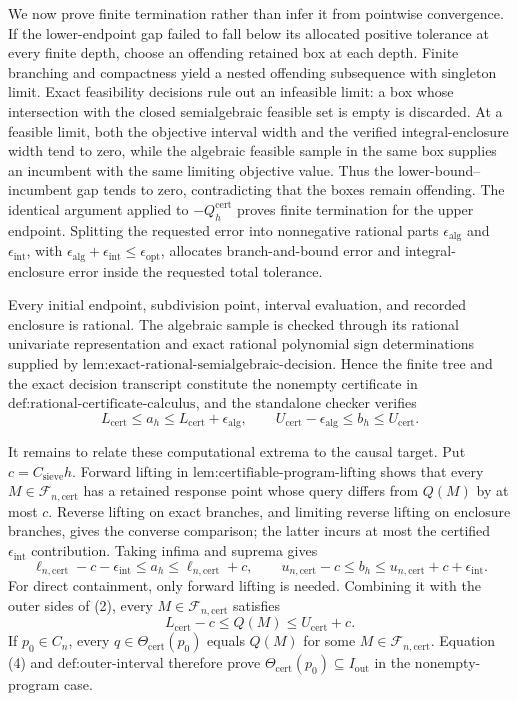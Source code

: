 We now prove finite termination rather than infer it from pointwise convergence.  If the lower-endpoint gap failed to fall below its allocated positive tolerance at every finite depth, choose an offending retained box at each depth.  Finite branching and compactness yield a nested offending subsequence with singleton limit.  Exact feasibility decisions rule out an infeasible limit: a box whose intersection with the closed semialgebraic feasible set is empty is discarded.  At a feasible limit, both the objective interval width and the verified integral-enclosure width tend to zero, while the algebraic feasible sample in the same box supplies an incumbent with the same limiting objective value.  Thus the lower-bound--incumbent gap tends to zero, contradicting that the boxes remain offending.  The identical argument applied to \(-Q_h^{\mathrm{cert}}\) proves finite termination for the upper endpoint.  Splitting the requested error into nonnegative rational parts \(\epsilon_{\mathrm{alg}}\) and \(\epsilon_{\mathrm{int}}\), with \(\epsilon_{\mathrm{alg}}+\epsilon_{\mathrm{int}}\leq\epsilon_{\mathrm{opt}}\), allocates branch-and-bound error and integral-enclosure error inside the requested total tolerance.

Every initial endpoint, subdivision point, interval evaluation, and recorded enclosure is rational.  The algebraic sample is checked through its rational univariate representation and exact rational polynomial sign determinations supplied by \(\text{lem:exact-rational-semialgebraic-decision}\).  Hence the finite tree and the exact decision transcript constitute the nonempty certificate in \(\text{def:rational-certificate-calculus}\), and the standalone checker verifies
\[
L_{\mathrm{cert}}\leq a_h\leq L_{\mathrm{cert}}+\epsilon_{\mathrm{alg}},
\qquad
U_{\mathrm{cert}}-\epsilon_{\mathrm{alg}}\leq b_h\leq U_{\mathrm{cert}}. \tag{2}
\]

It remains to relate these computational extrema to the causal target.  Put \(c=C_{\mathrm{sieve}}h\).  Forward lifting in \(\text{lem:certifiable-program-lifting}\) shows that every \(M\in\mathcal F_{n,\mathrm{cert}}\) has a retained response point whose query differs from \(Q(M)\) by at most \(c\).  Reverse lifting on exact branches, and limiting reverse lifting on enclosure branches, gives the converse comparison; the latter incurs at most the certified \(\epsilon_{\mathrm{int}}\) contribution.  Taking infima and suprema gives
\[
\ell_{n,\mathrm{cert}}-c-\epsilon_{\mathrm{int}}
\leq a_h\leq\ell_{n,\mathrm{cert}}+c,
\qquad
u_{n,\mathrm{cert}}-c
\leq b_h\leq u_{n,\mathrm{cert}}+c+\epsilon_{\mathrm{int}}. \tag{3}
\]
For direct containment, only forward lifting is needed.  Combining it with the outer sides of (2), every \(M\in\mathcal F_{n,\mathrm{cert}}\) satisfies
\[
L_{\mathrm{cert}}-c\leq Q(M)\leq U_{\mathrm{cert}}+c. \tag{4}
\]
If \(p_0\in C_n\), every \(q\in\Theta_{\mathrm{cert}}(p_0)\) equals \(Q(M)\) for some \(M\in\mathcal F_{n,\mathrm{cert}}\).  Equation (4) and \(\text{def:outer-interval}\) therefore prove \(\Theta_{\mathrm{cert}}(p_0)\subseteq I_{\mathrm{out}}\) in the nonempty-program case.

